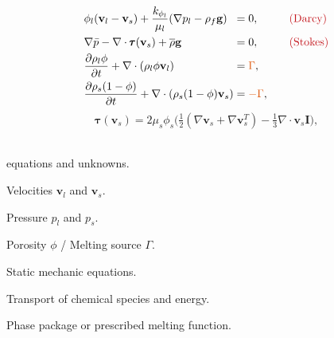 \documentclass[usenames,dvipsnames,letterpaper,landscape,final]{slides}
\begin{document}
\begin{myslide}


\begin{equation*}
\begin{alignedat}{3}
		  &\phi_l (\mathbf{v}_l - \mathbf{v}_s)
		  + \frac{k_{\phi_l}}{\mu_l}(\nabla p_l - \rho_f\mathbf{g})
	    &&= 0, \qquad &&\Maroon{\text{(Darcy)}}\\
		  &\nabla\bar p - \nabla \cdot \pmb{\tau}(\mathbf{v}_s) + \overline{\rho}\mathbf{g}&&= 0, \qquad &&\Maroon{\text{(Stokes)}}\\
&\frac{\partial \rho_l \phi}{\partial t} + \nabla\cdot (\rho_l \phi \mathbf{v}_l) &&= \Oorange{\Gamma} , \qquad && \\
&\frac{\partial \rho_s (1-\phi)}{\partial t} + \nabla\cdot (\rho_s (1-\phi) \mathbf{v}_s) &&= \Oorange{-\Gamma} , \qquad && 
\end{alignedat}
\end{equation*}
\begin{equation*}\label{eq:deviatoricstress}
		  \pmb{\tau}(\mathbf{v}_s)
		  = 2\mu_s\phi_s\big( \tfrac{1}{2}(\nabla \mathbf{v}_s + \nabla \mathbf{v}_s^T) - \tfrac{1}{3}\nabla \cdot \mathbf{v}_s \mathbf{I}\big),
\end{equation*}

\parbox{0.5\textwidth}{\raggedright
{} \\
 equations and  unknowns.
\begin{blist}
\item Velocities $\mathbf{v}_l$ and $\mathbf{v}_s$.
\item Pressure $p_l$ and $p_s$.
\item Porosity $\phi$ / Melting source $\Gamma$.
\end{blist}
}\parbox{0.5\textwidth}{\raggedright
{}
\begin{blist}
\item Static mechanic equations.
\item Transport of chemical species and energy.
\item Phase package or prescribed melting function.
\end{blist}
}

\end{myslide}
\end{document}
